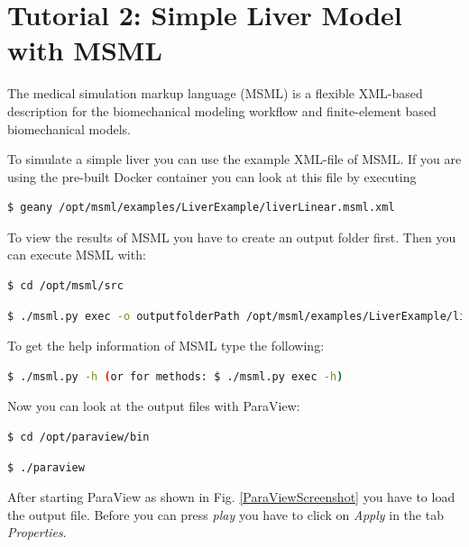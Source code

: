 \chapter{Tutorial 2: Simple Liver Model with MSML}

The medical simulation markup language (MSML) is a flexible XML-based description for the biomechanical modeling workflow and finite-element based biomechanical models.

To simulate a simple liver you can use the example XML-file of MSML.
If you are using the pre-built Docker container you can look at this file by executing
\begin{lstlisting}[language=sh, breaklines=true]
$ geany /opt/msml/examples/LiverExample/liverLinear.msml.xml
\end{lstlisting}

To view the results of MSML you have to create an output folder first.
Then you can execute MSML with:
\begin{lstlisting}[language=sh, breaklines=true]
$ cd /opt/msml/src
\end{lstlisting}
\begin{lstlisting}[language=sh, breaklines=true]
$ ./msml.py exec -o outputfolderPath /opt/msml/examples/LiverExample/liverLinear.msml.xml
\end{lstlisting}

To get the help information of MSML type the following:
\begin{lstlisting}[language=sh, breaklines=true]
$ ./msml.py -h (or for methods: $ ./msml.py exec -h)
\end{lstlisting}

Now you can look at the output files with ParaView:
\begin{lstlisting}[language=sh, breaklines=true]
$ cd /opt/paraview/bin
\end{lstlisting}
\begin{lstlisting}[language=sh, breaklines=true]
$ ./paraview
\end{lstlisting}

After starting ParaView as shown in Fig. \ref{ParaViewScreenshot} you have to load the output file.
Before you can press \emph{play} you have to click on \emph{Apply} in the tab \emph{Properties}.

